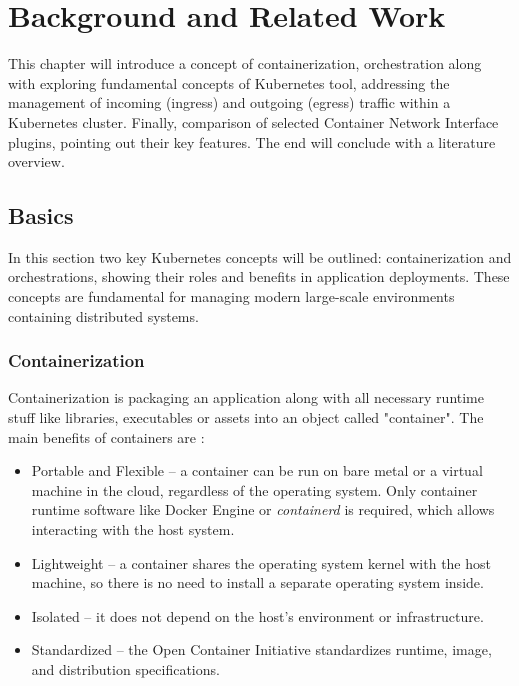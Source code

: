 \chapter{Background and Related Work}
\label{cha:background}

This chapter will introduce a concept of containerization, orchestration along with exploring fundamental concepts of Kubernetes tool, addressing the management of incoming (ingress) and outgoing (egress) traffic within a Kubernetes cluster. Finally, comparison of selected Container Network Interface plugins, pointing out their key features. The end will conclude with a literature overview.


\section{Basics}
\label{sec:basics}

In this section two key Kubernetes concepts will be outlined: containerization and orchestrations, showing their roles and benefits in application deployments. These concepts are fundamental for managing modern large-scale environments containing distributed systems.

\subsection{Containerization}
\label{sec:containerization}

Containerization is packaging an application along with all necessary runtime stuff like libraries, executables or assets into an object called "container". The main benefits of containers are \cite{RedhatContainerization}: 

\begin{itemize} 
    \item Portable and Flexible -- a container can be run on bare metal or a virtual machine in the cloud, regardless of the operating system. Only container runtime software like Docker Engine or \textit{containerd} is required, which allows interacting with the host system. 

    \item Lightweight -- a container shares the operating system kernel with the host machine, so there is no need to install a separate operating system inside. 

    \item Isolated -- it does not depend on the host's environment or infrastructure. 

    \item Standardized -- the Open Container Initiative standardizes runtime, image, and distribution specifications. 
\end{itemize}


